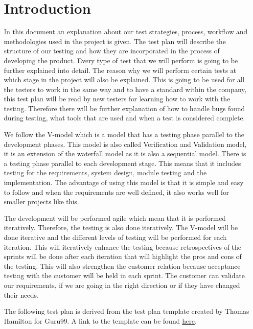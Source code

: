 \section{Introduction}
In this document an explanation about our test strategies, process, workflow and methodologies used in the project is given.  The test plan will describe the structure of our testing and how they are incorporated in the process of developing the product. Every type of test that we will perform is going to be further explained into detail. The reason why we will perform certain tests at which stage in the project will also be explained. This is going to be used for all the testers to work in the same way and to have a standard within the company, this test plan will be read by new testers for learning how to work with the testing. Therefore there will be further explanation of how to handle bugs found during testing, what tools that are used and when a test is considered complete. \newline 

\noindent We follow the V-model which is a model that has a testing phase parallel to the development phases. This model is also called Verification and Validation model, it is an extension of the waterfall model as it is also a sequential model. There is a testing phase parallel to each development stage. This means that it includes testing for the requirements, system design, module testing and the implementation. The advantage of using this model is that it is simple and easy to follow and when the requirements are well defined, it also works well for smaller projects like this.\newline

\noindent The development will be performed agile which mean that it is performed iteratively. Therefore, the testing is also done iteratively. The V-model will be done iterative and the different levels of testing will be performed for each iteration. This will iteratively enhance the testing because retrospectives of the sprints will be done after each iteration that will highlight the pros and cons of the testing. This will also strengthen the customer relation because acceptance testing with the customer will be held in each sprint. The customer can validate our requirements, if we are going in the right direction or if they have changed their needs. \newline

\noindent The following test plan is derived from the test plan template created by Thomas Hamilton for Guru99. A link to the template can be found \href{https://www.guru99.com/test-plan-for-project.html}{here}. 

